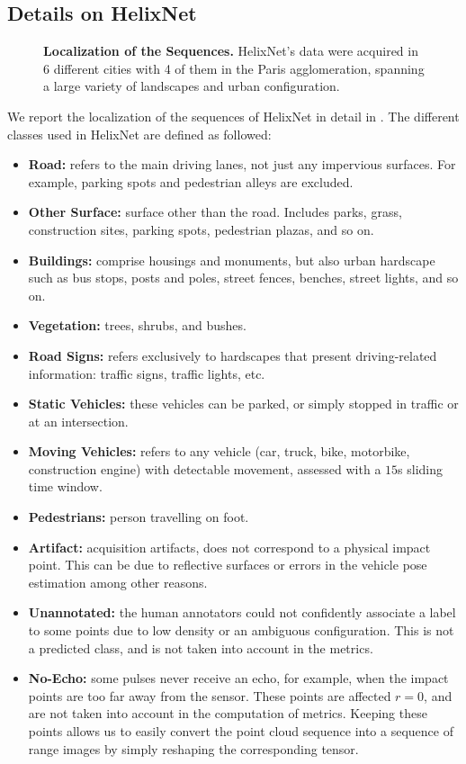 \documentclass[runningheads]{tpls/llncs}
\begin{document}
\subsection{Details on HelixNet}\label{sec:details_helixnet}
\begin{figure}
    \centering
    \hfill
    \caption{{\bf Localization of the Sequences.} HelixNet's data were acquired in 6 different cities with 4 of them in the Paris agglomeration, spanning a large variety of landscapes and urban configuration.}
    \label{fig:france}
\end{figure}
 We report the localization of the sequences of HelixNet in detail in . The different classes used in HelixNet are defined as followed:
 \begin{itemize}
     \item {\bf Road:} refers to the main driving lanes, not just any impervious surfaces. For example, parking spots and pedestrian alleys are excluded.
     \item {\bf Other Surface:} surface other than the road. Includes parks, grass, construction sites, parking spots, pedestrian plazas, and so on.
     \item {\bf Buildings:} comprise housings and monuments, but also urban hardscape such as bus stops, posts and poles, street fences, benches, street lights, and so on.
     \item {\bf Vegetation:} trees, shrubs, and bushes.
     \item {\bf Road Signs:} refers exclusively to hardscapes that present driving-related information: traffic signs, traffic lights, etc.
     \item {\bf Static Vehicles:} these vehicles can be parked, or simply stopped in traffic or at an intersection.
     \item {\bf Moving Vehicles:} refers to any vehicle (car, truck, bike, motorbike, construction engine) with detectable movement, assessed with a $15$s sliding time window.
     \item {\bf Pedestrians:} person travelling on foot. 
     \item {\bf Artifact:} acquisition artifacts, does not correspond to a physical impact point. This can be due to reflective surfaces or errors in the vehicle pose estimation among other reasons.
     \item {\bf Unannotated:} the human annotators could not confidently associate a label to some points due to low density or an ambiguous configuration. This is not a predicted class, and is not taken into account in the metrics.
     \item {\bf No-Echo:} some pulses never receive an echo, for example, when the impact points are too far away from the sensor. These points are affected $r=0$, and are not taken into account in the computation of metrics. Keeping these points allows us to easily convert the point cloud sequence into a sequence of range images by simply reshaping the corresponding tensor.
 \end{itemize}
\end{document}
